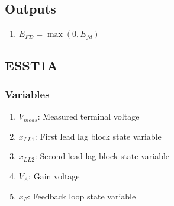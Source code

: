 \documentclass[12pt]{article}
\begin{document}
\subsection{Outputs}
\begin{enumerate}
  \item $E_{FD} = \max(0,E_{fd})$
\end{enumerate}

\subsection{ESST1A \cite{ESST1A}}

\subsubsection{Variables}
\begin{enumerate}
  \item $V_{meas}$: Measured terminal voltage
  \item $x_{LL1}$: First lead lag block state variable
  \item $x_{LL2}$: Second lead lag block state variable
  \item $V_A$: Gain voltage
  \item $x_F$: Feedback loop state variable
\end{enumerate}
\end{document}

